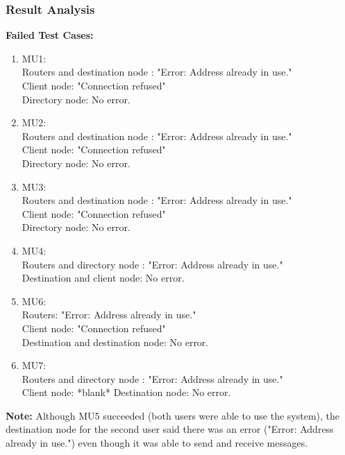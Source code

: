 \documentclass{article}
\begin{document}
\subsubsection{Result Analysis}
\textbf{Failed Test Cases: }
\begin{enumerate}
    \item MU1: \\
    Routers and destination node : "Error: Address already in use."\\
    Client node: "Connection refused"\\
    Directory node: No error.
    \item MU2: \\
    Routers and destination node : "Error: Address already in use."\\
    Client node: "Connection refused"\\
    Directory node: No error.
    \item MU3: \\
    Routers and destination node : "Error: Address already in use."\\
    Client node: "Connection refused"\\
    Directory node: No error.
    \item MU4: \\
    Routers and directory node : "Error: Address already in use."\\
    Destination and client node: No error.
    \item MU6: \\
    Routers: "Error: Address already in use."\\
    Client node: "Connection refused"\\
    Destination and destination node: No error.
    \item MU7: \\
    Routers and directory node : "Error: Address already in use."\\
    Client node: *blank*
    Destination node: No error.
\end{enumerate}

\textbf{Note: }Although MU5 succeeded (both users were able to use the system), the destination node for the second user said there was an error ("Error: Address already in use.") even though it was able to send and receive messages.
\end{document}
